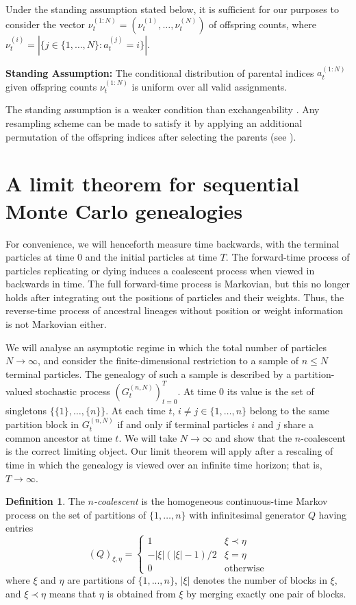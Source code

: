 \documentclass{article} %
\theoremstyle{definition}
\newtheorem{definition}{Definition}
\newcommand{\1}[1]{\mathbbm{1}_{\{#1\}}}
\begin{document}
Under the standing assumption stated below, it is sufficient for our purposes to consider the vector $\nu_t^{(1:N)} = (\nu_t^{(1)},\dots,\nu_t^{(N)})$ of offspring counts, where $\nu_t^{(i)} = |\{ j\in \{1,\dots,N\} : a_t^{(j)} =i \}|$.

\textbf{Standing Assumption:} The conditional distribution of parental indices $a_t^{(1:N)}$ given offspring counts $\nu_t^{(1:N)}$ is uniform over all valid assignments.

The standing assumption is a weaker condition than exchangeability \cite[p446]{mohle1998}.
Any resampling scheme can be made to satisfy it by applying an additional permutation of the offspring indices after selecting the parents (see \cite[p. 290]{andrieu2010}).

\section{A limit theorem for sequential Monte Carlo genealogies}
For convenience, we will henceforth measure time backwards, with the terminal particles at time 0 and the initial particles at time $T$. The forward-time process of particles replicating or dying induces a coalescent process when viewed in backwards in time.
The full forward-time process is Markovian, but this no longer holds after integrating out the positions of particles and their weights.
Thus, the reverse-time process of ancestral lineages without position or weight information is not Markovian either.

We will analyse an asymptotic regime in which the total number of particles $N\to\infty$, and consider the finite-dimensional restriction to a sample of $n\leq N$ terminal particles.
The genealogy of such a sample is described by a partition-valued stochastic process $(G_t^{(n,N)})_{t=0}^T$. At time 0 its value is the set of singletons $\{\{1\},\dots,\{n\}\}$. At each time $t$, $i\neq j \in \{1,\dots, n\}$ belong to the same partition block  in $G_t^{(n,N)}$ if and only if terminal particles $i$ and $j$ share a common ancestor at time $t$. We will take $N\to\infty$ and show that the $n$-coalescent \cite{kingman1982coal} is the correct limiting object.
Our limit theorem will apply after a rescaling of time in which the genealogy is viewed over an infinite time horizon; that is, $T\to\infty$.

\begin{definition}
\label{def:kingman}
The \emph{$n$-coalescent} is the homogeneous continuous-time Markov process on the set of partitions of $\{1,\dots,n\}$ with infinitesimal generator $Q$ having entries
\begin{equation*}
(Q)_{\xi,\eta} = \begin{cases}
1 & \xi \prec \eta\\
-|\xi|(|\xi|-1)/2 & \xi=\eta \\
0 & \text{otherwise}
\end{cases}
\end{equation*}
where $\xi$ and $\eta$ are partitions of $\{1,...,n\}$, $|\xi|$ denotes the number of blocks in $\xi$, and $\xi \prec \eta$ means that $\eta$ is obtained from $\xi$ by merging exactly one pair of blocks.
\end{definition}
\end{document}
